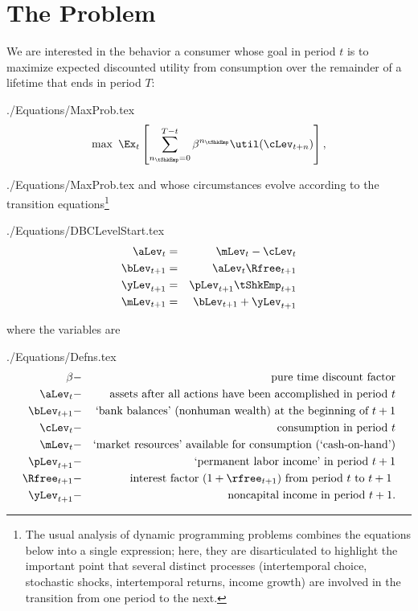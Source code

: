 \documentclass[titlepage]{\econtex}
\begin{document}
\section{The Problem}\label{sec:basicproblem}
We are interested in the behavior a consumer whose goal in period $t$ is to
maximize expected discounted utility from consumption over the remainder of a
lifetime that ends in period $T$:
\begin{verbatimwrite}{./Equations/MaxProb.tex}
  \begin{equation}\label{eq:MaxProb}
    \max ~ \Ex_{t}\left[ \sum_{n_{\tShkEmp}=0}^{T-t} {\DiscAlt}^{n_{\tShkEmp}} \util({\cLev}_{t+n})\right],
  \end{equation}
\end{verbatimwrite}
 {./Equations/MaxProb.tex}
and whose circumstances evolve according to the transition equations\footnote{The usual analysis of dynamic programming problems combines the equations below into a single expression; here, they are disarticulated to highlight the important point that several distinct processes (intertemporal choice, stochastic shocks, intertemporal returns, income growth) are involved in the transition from one period to the next.}
\begin{verbatimwrite}{./Equations/DBCLevelStart.tex}
  \begin{eqnarray}
    {\aLev}_{t} & = & \mLev_{t}-\cLev_{t} \label{DBCLevelStart}
    \\  {\bLev}_{t+1} & = & {\aLev}_{t} \Rfree_{t+1}
    \\  {\yLev}_{t+1} & = & \pLev_{t+1}\tShkEmp_{t+1}
    \\  {\mLev}_{t+1} & = & {\bLev}_{t+1} + {\yLev}_{t+1} \label{eq:budconstr} \label{DBCLevelEnd}
  \end{eqnarray}
\end{verbatimwrite}

where the variables are
\begin{verbatimwrite}{./Equations/Defns.tex}
  \begin{eqnarray*}
    {\DiscAlt} & - & \text{pure time discount factor} \\
    {\aLev}_{t} & - & \text{assets after all actions have been accomplished in period $t$} \\
    {\bLev}_{t+1} & - & \text{`bank balances' (nonhuman wealth) at the beginning of $t+1$} \\
    {\cLev}_{t} & - & \text{consumption in period $t$} \\
    {\mLev}_{t} & - & \text{`market resources' available for consumption (`cash-on-hand')} \\
    \pLev_{t+1} & - & \text{`permanent labor income' in period $t+1$} \\
    \Rfree_{t+1} & - & \text{interest factor $(1+\rfree_{t+1})$ from period $t$ to $t+1$ } \\
    {\yLev}_{t+1} & - & \text{noncapital income in period $t+1$}.
  \end{eqnarray*}
\end{verbatimwrite}
\end{document}
